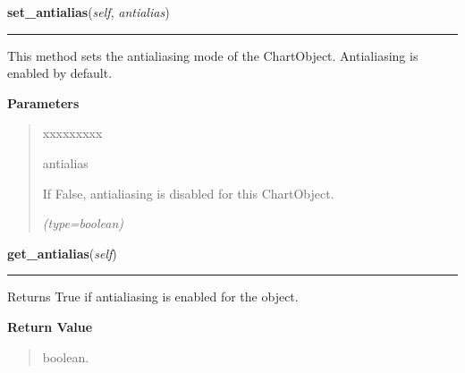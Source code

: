 \hspace{.8\funcindent}\begin{boxedminipage}{\funcwidth}

    \raggedright \textbf{set\_antialias}(\textit{self}, \textit{antialias})

    \vspace{-1.5ex}

    \rule{\textwidth}{0.5\fboxrule}
\setlength{\parskip}{2ex}
    This method sets the antialiasing mode of the ChartObject. Antialiasing
    is enabled by default.

\setlength{\parskip}{1ex}
      \textbf{Parameters}
      \vspace{-1ex}

      \begin{quote}
        \begin{Ventry}{xxxxxxxxx}

          \item[antialias]

          If False, antialiasing is disabled for this ChartObject.

            {\it (type=boolean)}

        \end{Ventry}

      \end{quote}

    \end{boxedminipage}

    \label{pygtk_chart:chart_object:ChartObject:get_antialias}

    \vspace{0.5ex}

\hspace{.8\funcindent}\begin{boxedminipage}{\funcwidth}

    \raggedright \textbf{get\_antialias}(\textit{self})

    \vspace{-1.5ex}

    \rule{\textwidth}{0.5\fboxrule}
\setlength{\parskip}{2ex}
    Returns True if antialiasing is enabled for the object.

\setlength{\parskip}{1ex}
      \textbf{Return Value}
    \vspace{-1ex}

      \begin{quote}
      boolean.

      \end{quote}

    \end{boxedminipage}

